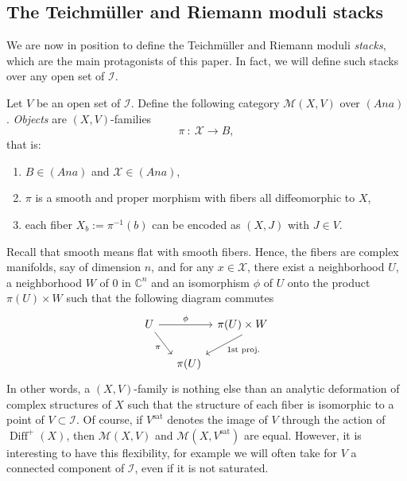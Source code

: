 \documentclass[10pt]{amsart}
\let\mathcal\mathscr
\newcommand{\Ana}{\mathit{Ana}}
\newcommand{\sat}{\mathrm{sat}}
\DeclareMathOperator{\Diff}{Diff}
\theoremstyle{plain}
\theoremstyle{definition}
\theoremstyle{remark}
\numberwithin{equation}{section}
\newcommand{\CC}{{\mathbb{C}}}
\newcommand{\cI}{\mathcal{I}}
\begin{document}
\subsection{The Teichmüller and Riemann moduli stacks}
\label{stacks}
We are now in position to define the Teichmüller and Riemann moduli \emph{stacks}, which are the main protagonists of this paper. In fact, we will define such stacks over any open set of $\cI$.

Let $V$ be an open set of $\cI$. Define the following category $\mathcal M(X,V)$ over $(\Ana)$. \emph{Objects} are $(X, V)$-families
\begin{equation}
\label{XVfamily}
\pi\ :\ \mathcal X\longrightarrow B,
\end{equation}
that is:
\begin{enumerate}
\item
$B\in (\Ana)$ and $\mathcal X\in(\Ana)$,

\item
$\pi$ is a smooth and proper morphism with fibers all diffeomorphic to $X$,

\item
each fiber $X_b:=\pi^{-1}(b)$ can be encoded as $(X, J)$ with $J\in V$.
\end{enumerate}
Recall that smooth means flat with smooth fibers. Hence, the fibers are complex manifolds, say of dimension $n$, and for any $x\in\mathcal X$, there exist a neighborhood $U$, a neighborhood $W$ of $0$ in $\CC^n$ and an isomorphism $\phi$ of $U$ onto the product $\pi(U)\times W$ such that the following diagram commutes
\begin{equation}
\label{flatness}
\begin{tikzcd}[column sep=tiny, row sep=normal]
U \arrow[rrr,"\phi"] \arrow[rrd, end anchor = north west,"\pi"'] &&&\pi(U)\times W\arrow[dl, start anchor = south, end anchor = north east,"\text{1st proj.}"]\\
&&\pi (U)&
\end{tikzcd}
\end{equation}
In other words, a $(X, V)$-family is nothing else than an analytic deformation of complex structures of $X$ such that the structure of each fiber is isomorphic to a point of $V\subset \cI$. Of course, if $V^{\sat}$ denotes the image of $V$ through the action of $\Diff^+(X)$, then $\mathcal M(X,V)$ and $\mathcal M(X,V^{\sat})$ are equal. However, it is interesting to have this flexibility, for example we will often take for $V$ a connected component of $\cI$, even if it is not saturated.
\end{document}
